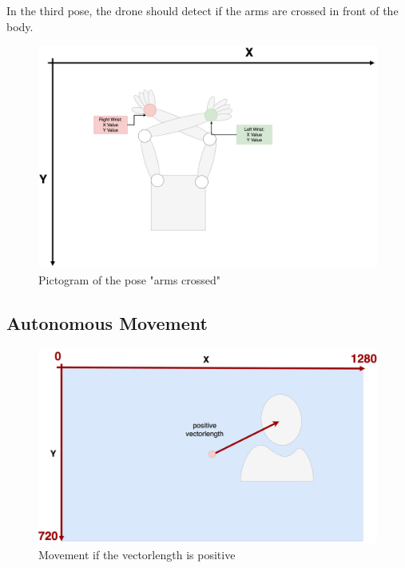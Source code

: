 \documentclass[a4paper,11pt,singlespacing]{article}
\begin{document}
In the third pose, the drone should detect if the arms are crossed in front of the body.

\begin{figure}[H]
	\centering
	\includegraphics[width=\textwidth]{images/arms_crossed.png}
	\caption{Pictogram of the pose "arms crossed"}
	\label{arms_crossed}
\end{figure}
\subsection{Autonomous Movement}

\begin{figure}[H]
	\centering
	\includegraphics[width=\textwidth]{images/positive_vector_length.png}
	\caption{Movement if the vectorlength is positive}
	\label{positive_vectortlength}
\end{figure}
\end{document}
